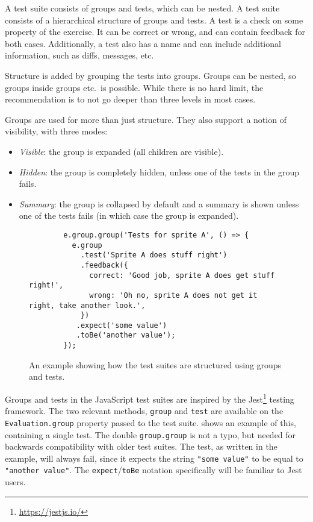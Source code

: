 \documentclass[../main]{subfiles}
\begin{document}
A test suite consists of groups and tests, which can be nested.
A test suite consists of a hierarchical structure of groups and tests.
A test is a check on some property of the exercise.
It can be correct or wrong, and can contain feedback for both cases.
Additionally, a test also has a name and can include additional information, such as diffs, messages, etc.

Structure is added by grouping the tests into groups.
Groups can be nested, so groups inside groups etc.\ is possible.
While there is no hard limit, the recommendation is to not go deeper than three levels in most cases.

Groups are used for more than just structure.
They also support a notion of visibility, with three modes:

\begin{itemize}
    \item \emph{Visible}: the group is expanded (all children are visible).
    \item \emph{Hidden}: the group is completely hidden, unless one of the tests in the group fails.
    \item \emph{Summary}: the group is collapsed by default and a summary is shown unless one of the tests fails (in which case the group is expanded).
\end{itemize}

\begin{figure}
    \centering
    \begin{verbatim}
        e.group.group('Tests for sprite A', () => {
          e.group
            .test('Sprite A does stuff right')
            .feedback({
              correct: 'Good job, sprite A does get stuff right!',
              wrong: 'Oh no, sprite A does not get it right, take another look.',
            })
           .expect('some value')
           .toBe('another value');
        });
    \end{verbatim}
    \caption{An example showing how the test suites are structured using groups and tests.}\label{fig:itch-test-suite-structure}
\end{figure}

Groups and tests in the JavaScript test suites are inspired by the Jest\footnote{\url{https://jestjs.io/}} testing framework.
The two relevant methods, \texttt{group} and \texttt{test} are available on the \texttt{Evaluation.group} property passed to the test suite.
 shows an example of this, containing a single test.
The double \texttt{group.group} is not a typo, but needed for backwards compatibility with older test suites.
The test, as written in the example, will always fail, since it expects the string \texttt{"some value"} to be equal to \texttt{"another value"}.
The \texttt{expect}/\texttt{toBe} notation specifically will be familiar to Jest users.
\end{document}
